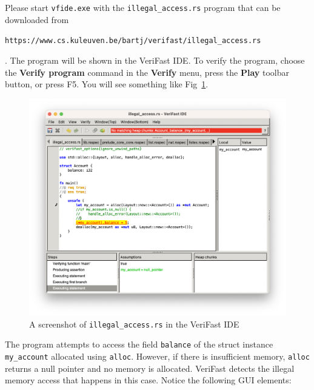 \documentclass{article}
\begin{document}
Please start \texttt{vfide.exe} with the \texttt{illegal\_access.rs}
program that can be downloaded from
\begin{center}
\texttt{https://www.cs.kuleuven.be/bartj/verifast/illegal\_access.rs}
\end{center}
. The program will be shown in the VeriFast IDE. To verify the program,
choose the \textbf{Verify program} command in the \textbf{Verify} menu,
press the \textbf{Play} toolbar button, or press F5. You will see
something like Fig~\ref{figure:illegal-access1}.
\begin{figure}
\begin{center}
\includegraphics[width=12cm]{illegal_access.png}
\end{center}
\caption{A screenshot of \texttt{illegal\_access.rs} in the VeriFast IDE}\label{figure:illegal-access1}
\end{figure}
The program attempts to access the field \lstinline|balance| of the struct
instance \lstinline|my_account| allocated using \lstinline|alloc|. However,
if there is insufficient memory, \lstinline|alloc| returns a null pointer and no
memory is allocated. VeriFast detects the illegal memory access that
happens in this case. Notice the following GUI elements:
\end{document}
